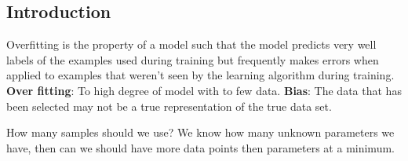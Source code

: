 \begin{multicols}{2}
\section{Introduction}
Overfitting is the property of a model such that the model
predicts very well labels of the examples used during training but frequently makes errors
when applied to examples that weren’t seen by the learning algorithm during training.
\textbf{Over fitting}: To high degree of model with to few data.
\textbf{Bias}: The data that has been selected may not be a true representation of 
the true data set. 

How many samples should we use? We know how many unknown parameters we have, then 
can we should have more data points then parameters at a minimum.


\end{multicols}
